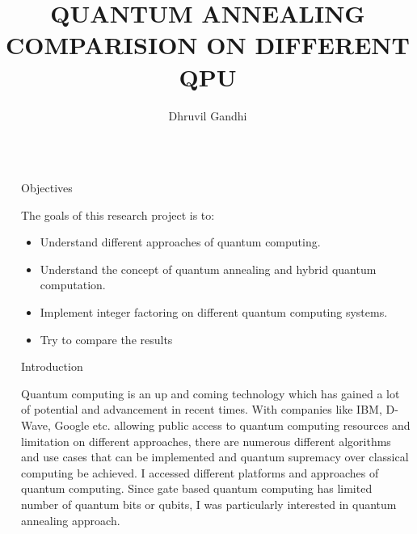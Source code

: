 \documentclass[final]{beamer}
\title{QUANTUM ANNEALING COMPARISION ON DIFFERENT QPU} %
\author{Dhruvil Gandhi} %
\institute{Seidenberg School of CSIS, Pace University} %
\newlength{\sepwid}
\newlength{\onecolwid}
\begin{document}

\setlength{\belowcaptionskip}{2ex} %
\setlength\belowdisplayshortskip{2ex} %

\begin{frame}[t] %

\begin{columns}[t] %

\begin{column}{\sepwid}\end{column} %

\begin{column}{\onecolwid} %


\begin{alertblock}{Objectives}

The goals of this research project is to:
\begin{itemize}
\item Understand different approaches of quantum computing.
\item Understand the concept of quantum annealing and hybrid quantum computation.
\item Implement integer factoring on different quantum computing systems. 
\item Try to compare the results
\end{itemize}

\end{alertblock}


\begin{block}{Introduction}

    Quantum computing is an up and coming technology which has gained a lot of potential and advancement in recent times. With companies like IBM, D-Wave, Google etc. allowing public access to quantum computing resources and limitation on different approaches, there are numerous different algorithms and use cases that can be implemented and quantum supremacy over classical computing be achieved. I accessed different platforms and approaches of quantum computing. Since gate based quantum computing has limited number of quantum bits or qubits, I was particularly interested in quantum annealing approach. 


\end{block}
\end{column}
\end{columns}
\end{frame}
\end{document}
